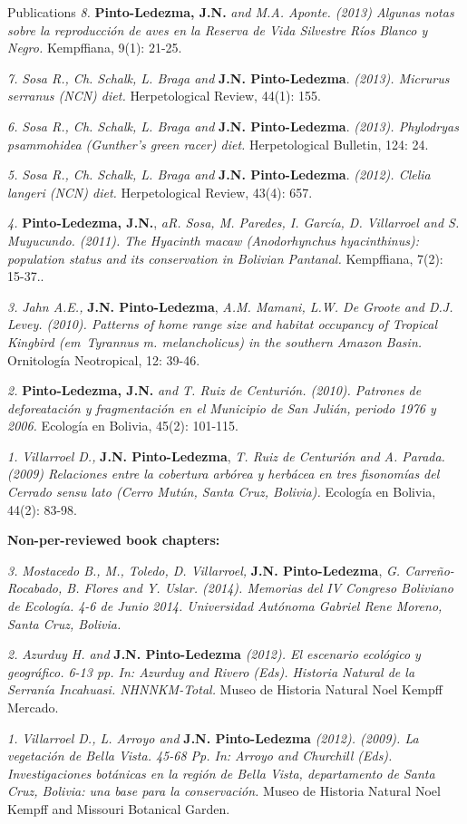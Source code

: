 \documentclass{resume} %
\begin{document}
\begin{rSection}{Publications}
{\em 8.} {\bf{Pinto-Ledezma, J.N.}} {\em and M.A. Aponte. (2013) Algunas notas sobre la reproducción de aves en la Reserva de Vida Silvestre Ríos Blanco y Negro.} {Kempffiana, 9(1): 21-25}.

{\em 7.} {\em *Sosa R., Ch. Schalk, L. Braga and} {\bf{J.N. Pinto-Ledezma}}. {\em (2013). {\em Micrurus serranus} (NCN) diet.} {Herpetological Review, 44(1): 155}. 

{\em 6.} {\em *Sosa R., Ch. Schalk, L. Braga and} {\bf{J.N. Pinto-Ledezma}}. {\em (2013). {\em Phylodryas psammohidea} (Gunther's green racer) diet.} {Herpetological Bulletin, 124: 24}. 

{\em 5.} {\em *Sosa R., Ch. Schalk, L. Braga and} {\bf{J.N. Pinto-Ledezma}}. {\em (2012). {\em Clelia langeri} (NCN) diet.} {Herpetological Review, 43(4): 657}. 

{\em 4.} {\bf{Pinto-Ledezma, J.N.}}, {\em aR. Sosa, M. Paredes, I. García, D. Villarroel and S. Muyucundo. (2011). The Hyacinth macaw ({\em Anodorhynchus hyacinthinus}): population status and its conservation in Bolivian Pantanal.} {Kempffiana, 7(2): 15-37.}. 

{\em 3.} {\em Jahn A.E.,} {\bf{J.N. Pinto-Ledezma}}, {\em A.M. Mamani, L.W. De Groote and D.J. Levey. (2010). Patterns of home range size and habitat occupancy of Tropical Kingbird ({em\ Tyrannus m. melancholicus}) in the southern Amazon Basin.} {Ornitología Neotropical, 12: 39-46}. 

{\em 2.} {\bf{Pinto-Ledezma, J.N.}} {\em and T. Ruiz de Centurión. (2010). Patrones de deforeatación y fragmentación en el Municipio de San Julián, periodo 1976 y 2006.} {Ecología en Bolivia, 45(2): 101-115}.

{\em 1.} {\em Villarroel D.,} {\bf{J.N. Pinto-Ledezma}}, {\em T. Ruiz de Centurión and A. Parada. (2009) Relaciones entre la cobertura arbórea y herbácea en tres fisonomías del Cerrado {\em sensu lato} (Cerro Mutún, Santa Cruz, Bolivia).} {Ecología en Bolivia, 44(2): 83-98}. 

{\bf Non-per-reviewed book chapters:}

{\em 3.} {\em Mostacedo B., M., Toledo, D. Villarroel,} {\bf{J.N. Pinto-Ledezma}}, {\em G. Carreño-Rocabado, B. Flores and Y. Uslar. (2014). Memorias del IV Congreso Boliviano de Ecología. 4-6 de Junio 2014. Universidad Autónoma Gabriel Rene Moreno, Santa Cruz, Bolivia.}

{\em 2.} {\em Azurduy H. and} {\bf{J.N. Pinto-Ledezma}} {\em (2012). El escenario ecológico y geográfico. 6-13 pp. In: Azurduy and Rivero (Eds). Historia Natural de la Serranía Incahuasi. NHNNKM-Total.} {Museo de Historia Natural Noel Kempff Mercado}. 

{\em 1.} {\em Villarroel D., L. Arroyo and} {\bf{J.N. Pinto-Ledezma}} {\em (2012). (2009). La vegetación de Bella Vista. 45-68 Pp. In: Arroyo and Churchill (Eds). Investigaciones botánicas en la región de Bella Vista, departamento de Santa Cruz, Bolivia: una base para la conservación.} {Museo de Historia Natural Noel Kempff and Missouri Botanical Garden}. 

\end{rSection}
\end{document}
